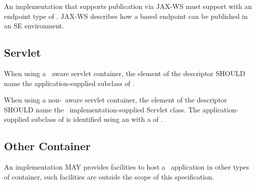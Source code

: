 An implementation that supports publication via JAX-WS must support  with an endpoint type of . JAX-WS describes how a  based endpoint can be published in an SE environment.

\subsection{Servlet}

When using a \jaxrs\ aware servlet container, the  element of the  descriptor SHOULD name the application-supplied subclass of .

When using a non-\jaxrs\ aware servlet container, the  element of the  descriptor SHOULD name the \jaxrs\ implementation-supplied Servlet class. The application-supplied subclass of  is identified using an  with a  of .

\subsection{Other Container}

An implementation MAY provides facilities to host a \jaxrs\ application in other types of container, such facilities are outside the scope of this specification.